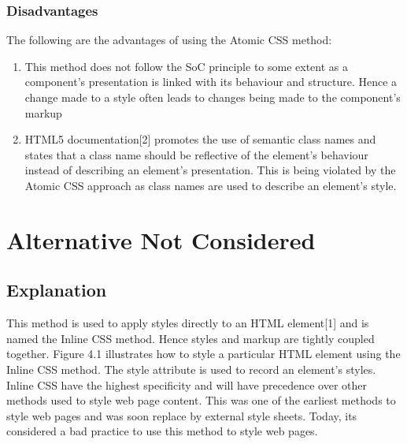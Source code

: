 \documentclass[12pt]{article}
\begin{document}
\subsubsection{Disadvantages}
The following are the advantages of using the Atomic CSS method:
\begin{enumerate}
	\item This method does not follow the SoC principle to some extent as a component's presentation is linked with its behaviour and structure. Hence a change made to a style often leads to changes being made to the component's markup

	\item HTML5 documentation[2] promotes the use of semantic class names and states that a class name should be reflective of the element's behaviour instead of describing an element's presentation. This is being violated by the Atomic CSS approach as class names are used to describe an element's style.
\end{enumerate}






\newpage

\section{Alternative Not Considered}
\subsection{Explanation}
This method is used to apply styles directly to an HTML element[1] and is named the Inline CSS method. Hence styles and markup are tightly coupled together. Figure 4.1 illustrates how to style a particular HTML element using the Inline CSS method. The style attribute is used to record an element's styles. Inline CSS have the highest specificity and will have precedence over other methods used to style web page content. This was one of the earliest methods to style web pages and was soon replace by external style sheets. Today, its considered a bad practice to use this method to style web pages.
\end{document}
